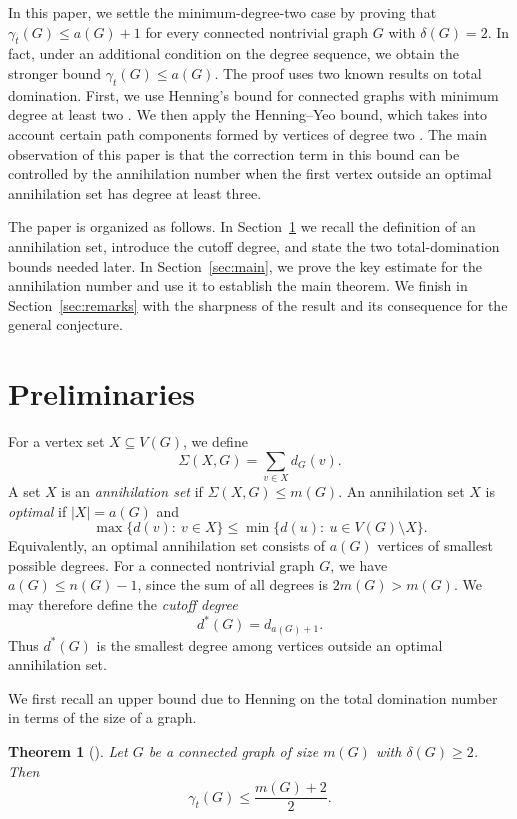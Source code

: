 \documentclass[12pt]{article}
\newtheorem{theorem}{Theorem}
\begin{document}
In this paper, we settle the minimum-degree-two case by proving that $\gamma_t(G)\le a(G)+1$ for every connected nontrivial graph $G$ with $\delta(G)=2$. In fact, under an additional condition on the degree sequence, we obtain the stronger bound $\gamma_t(G)\le a(G)$. The proof uses two known results on total domination. First, we use Henning's bound for connected graphs with minimum degree at least two \cite{Henning2000}. We then apply the Henning--Yeo bound, which takes into account certain path components formed by vertices of degree two \cite{HenningYeo2007}. The main observation of this paper is that the correction term in this bound can be controlled by the annihilation number when the first vertex outside an optimal annihilation set has degree at least three.

\medskip

The paper is organized as follows. In Section~\ref{sec:prelim} we recall the definition of an annihilation set, introduce the cutoff degree, and state the two total-domination bounds needed later. In Section~\ref{sec:main}, we prove the key estimate for the annihilation number and use it to establish the main theorem. We finish in Section~\ref{sec:remarks} with the sharpness of the result and its consequence for the general conjecture.


\section{Preliminaries}\label{sec:prelim}

For a vertex set $X\subseteq V(G)$, we define
$$\Sigma(X,G)=\sum_{v\in X}d_G(v).$$
A set $X$ is an \emph{annihilation set} if $\Sigma(X,G)\le m(G)$. An annihilation set $X$ is \emph{optimal} if $|X|=a(G)$ and
$$\max\{d(v):\ v\in X\}\le \min\{d(u):\ u\in V(G)\setminus X\}.$$
Equivalently, an optimal annihilation set consists of $a(G)$ vertices of smallest possible degrees. For a connected nontrivial graph $G$, we have $a(G)\le n(G)-1$, since the sum of all degrees is $2m(G)>m(G)$. We may therefore define the \emph{cutoff degree}
$$d^*(G)=d_{a(G)+1}.$$
Thus $d^*(G)$ is the smallest degree among vertices outside an optimal annihilation set.

\medskip

We first recall an upper bound due to Henning on the total domination number in terms of the size of a graph.

\begin{theorem}[\cite{Henning2000}]\label{thm:Henning-size}
Let $G$ be a connected graph of size $m(G)$ with $\delta(G)\ge 2$. Then
$$\gamma_t(G)\le \frac{m(G)+2}{2}.$$
\end{theorem}
\end{document}
